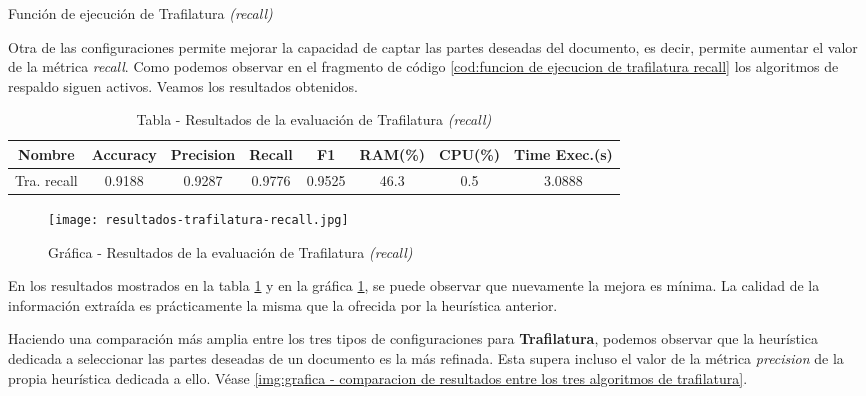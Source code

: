\begin{codefloat}
    
    \caption{Función de ejecución de Trafilatura \emph{(recall)}}
    \label{cod:funcion de ejecucion de trafilatura recall}
\end{codefloat}

Otra de las configuraciones permite mejorar la capacidad de captar las partes deseadas del documento, es
decir, permite aumentar el valor de la métrica \emph{recall}. Como podemos observar en el fragmento de
código \ref{cod:funcion de ejecucion de trafilatura recall} los algoritmos de respaldo siguen activos. 
Veamos los resultados obtenidos.

\begin{table}[h]
    \begin{center}
      \begin{tabular}{| c | c | c | c | c | c | c | c |} \hline 
       \textbf{Nombre} & \textbf{Accuracy} & \textbf{Precision}  & \textbf{Recall} & \textbf{F1} & \textbf{RAM(\%)} & \textbf{CPU(\%)} & \textbf{Time Exec.(s)} \\ \hline
       Tra. recall & 0.9188 & 0.9287 & 0.9776 & 0.9525 & 46.3 & 0.5 & 3.0888 \\ \hline
      \end{tabular}
      \caption{Tabla - Resultados de la evaluación de Trafilatura \emph{(recall)}}
      \label{tab:tabla - resultados de la evaluacion de trafilatura recall}
    \end{center}
\end{table}

\begin{figure}[tphb]
    \centering
    \texttt{[image: resultados-trafilatura-recall.jpg]}
    \caption{Gráfica - Resultados de la evaluación de Trafilatura \emph{(recall)}}
    \label{img:grafica - resultados de la evaluacion de trafilatura recall}
\end{figure}

En los resultados mostrados en la tabla \ref{tab:tabla - resultados de la evaluacion de trafilatura recall}
y en la gráfica \ref{img:grafica - resultados de la evaluacion de trafilatura recall}, se puede observar
que nuevamente la mejora es mínima. La calidad de la información extraída es prácticamente la misma que la
ofrecida por la heurística anterior.

Haciendo una comparación más amplia entre los tres tipos de configuraciones para \textbf{Trafilatura},
podemos observar que la heurística dedicada a seleccionar las partes deseadas de un documento es la más
refinada. Esta supera incluso el valor de la métrica \emph{precision} de la propia heurística dedicada a 
ello. Véase \ref{img:grafica - comparacion de resultados entre los tres algoritmos de trafilatura}.

